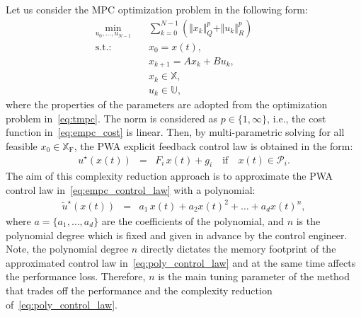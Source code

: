 \documentclass[letterpaper, 10 pt, conference]{ieeeconf}
\newcommand{\polydegree}{n}
\begin{document}
	Let us consider the MPC optimization problem in the following form:
	\begin{subequations}
		\label{eq:empc}
		\begin{eqnarray}
			\label{eq:empc_cost}
			\min_{u_{0},\ldots,u_{N-1}} \!\!\!\!\!\!\!\!\!\!\! &\,& \sum_{k=0}^{N-1} \left( \Vert x_{k} \Vert_{Q}^{p} + \Vert u_{k} \Vert_{R}^{p} \right) \qquad \\
			\label{eq:empc_rpi}
			\mathrm{s.t.\!:} &\,& x_0 = x(t), \\
			\label{eq:empc_model}
			&\,&  x_{k+1} = A x_{k} + B u_{k} , \\
			\label{eq:empc_constraints_state}
			&\,& x_{k} \in \mathbb{X} , \\
			\label{eq:empc_constraints_input}
			&\,& u_{k} \in \mathbb{U},
		\end{eqnarray}
	\end{subequations}
	where the properties of the parameters are adopted from the optimization problem in~\eqref{eq:tmpc}. The norm is considered as $p \in \{1,\infty \}$, i.e., the cost function in~\eqref{eq:empc_cost} is linear. Then, by multi-parametric solving for all feasible $x_0 \in \mathbb{X}_{\mathrm{F}}$, the PWA explicit feedback control law is obtained in the form:
	\begin{eqnarray}
		\label{eq:empc_control_law}
		u^{\star}(x(t)) \!\!\!\!&=&\!\!\!\! F_{i} \, x(t) + g_{i} \quad \text{if} \quad x(t) \in \mathcal{P}_{i}.
	\end{eqnarray}
	The aim of this complexity reduction approach is to approximate the PWA control law in~\eqref{eq:empc_control_law} with a polynomial:
	\begin{eqnarray}
		\label{eq:poly_control_law}
		\widetilde{u}^{\star}(x(t)) \!\!\!\!&=&\!\!\!\! a_{1} \, x(t) + a_{2} x(t)^2 + \dots + a_{d} x(t)^\polydegree,
	\end{eqnarray}
	where $a =\{a_{1}, \dots, a_{d}\}$ are the coefficients of the polynomial, and $\polydegree$ is the polynomial degree which is fixed and given in advance by the control engineer. Note, the polynomial degree $\polydegree$ directly dictates the memory footprint of the approximated control law in~\eqref{eq:poly_control_law} and at the same time affects the performance loss. Therefore, $\polydegree$ is the main tuning parameter of the method that trades off the performance and the complexity reduction of~\eqref{eq:poly_control_law}.
	
\end{document}
